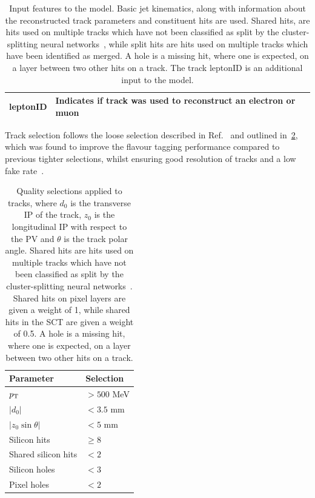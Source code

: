 \begin{table}[!htbp]
\begin{tabular}{ll}
    leptonID   & Indicates if track was used to reconstruct an electron or muon \\
    \bottomrule
  \end{tabular}
  \caption{
    Input features to the \GNN model.
    Basic jet kinematics, along with information about the reconstructed track parameters and constituent hits are used.
    Shared hits, are hits used on multiple tracks which have not been classified as split by the cluster-splitting neural networks~\cite{PERF-2015-08}, while split hits are hits used on multiple tracks which have been identified as merged.
    A hole is a missing hit, where one is expected, on a layer between two other hits on a track.
    The track leptonID is an additional input to the \GNNLep model.
  }
  \label{tab:track_inputs}
\end{table}


Track selection follows the loose selection described in Ref.~\cite{ATL-PHYS-PUB-2020-014} and outlined in~\cref{tab:track_selections}, which was found to improve the flavour tagging performance compared to previous tighter selections, whilst ensuring good resolution of tracks and a low fake rate~\cite{PERF-2015-08}.

\begin{table}[!htbp]
  \footnotesize\centering
  \setlength{\tabcolsep}{0.5em} %
  \begin{tabular}{ll}
    \toprule 
    \textbf{Parameter} & \textbf{Selection} \\
    \hline
    $p_{\text{T}}$                & $> 500$ MeV \\
    $|d_0|$              & $< 3.5$ mm \\
    $|z_0 \sin\theta|$   & $< 5$ mm \\
    Silicon hits         & $\ge 8$ \\
    Shared silicon hits  & $< 2$ \\
    Silicon holes        & $< 3$ \\
    Pixel holes          & $< 2$ \\
    \bottomrule
  \end{tabular}
  \caption{
    Quality selections applied to tracks,
    where $d_0$ is the transverse IP of the track, $z_0$ is the longitudinal IP with respect to the PV and $\theta$ is the track polar angle.
    Shared hits are hits used on multiple tracks which have not been classified as split by the cluster-splitting neural networks~\cite{PERF-2015-08}.
    Shared hits on pixel layers are given a weight of 1, while shared hits in the SCT are given a weight of 0.5.
    A hole is a missing hit, where one is expected, on a layer between two other hits on a track.
    }
  \vspace{4mm}
  \label{tab:track_selections}
\end{table}



